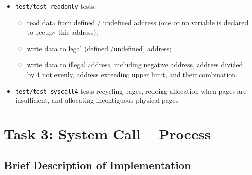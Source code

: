 \documentclass{article}
\begin{document}
\begin{itemize}
\item
\texttt{test/test\_readonly} tests:
	\begin{itemize}
	\item
	read data from defined / undefined address (one or no variable is declared to occupy this address);
	\item
	write data to legal (defined /undefined) address;
	\item
	write data to illegal address, including negative address, address divided by 4 not evenly, address exceeding upper limit, and their combination.
	\end{itemize}

\item
\texttt{test/test\_syscall4} tests recycling pages, redoing allocation when pages are insufficient, and allocating incontiguous physical pages
\end{itemize}

\section{Task 3: System Call -- Process}

\subsection{Brief Description of Implementation}
\end{document}
